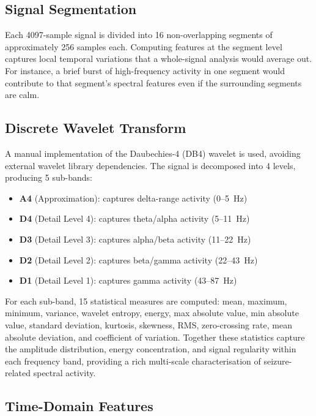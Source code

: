 \subsection{Signal Segmentation}

Each 4097-sample signal is divided into 16 non-overlapping segments of approximately 256 samples each. Computing features at the segment level captures local temporal variations that a whole-signal analysis would average out. For instance, a brief burst of high-frequency activity in one segment would contribute to that segment's spectral features even if the surrounding segments are calm.

\subsection{Discrete Wavelet Transform}

A manual implementation of the Daubechies-4 (DB4) wavelet is used, avoiding external wavelet library dependencies. The signal is decomposed into 4 levels, producing 5 sub-bands:

\begin{itemize}
    \item \textbf{A4} (Approximation): captures delta-range activity (0--5~Hz)
    \item \textbf{D4} (Detail Level 4): captures theta/alpha activity (5--11~Hz)
    \item \textbf{D3} (Detail Level 3): captures alpha/beta activity (11--22~Hz)
    \item \textbf{D2} (Detail Level 2): captures beta/gamma activity (22--43~Hz)
    \item \textbf{D1} (Detail Level 1): captures gamma activity (43--87~Hz)
\end{itemize}

For each sub-band, 15 statistical measures are computed: mean, maximum, minimum, variance, wavelet entropy, energy, max absolute value, min absolute value, standard deviation, kurtosis, skewness, RMS, zero-crossing rate, mean absolute deviation, and coefficient of variation. Together these statistics capture the amplitude distribution, energy concentration, and signal regularity within each frequency band, providing a rich multi-scale characterisation of seizure-related spectral activity.

\subsection{Time-Domain Features}

